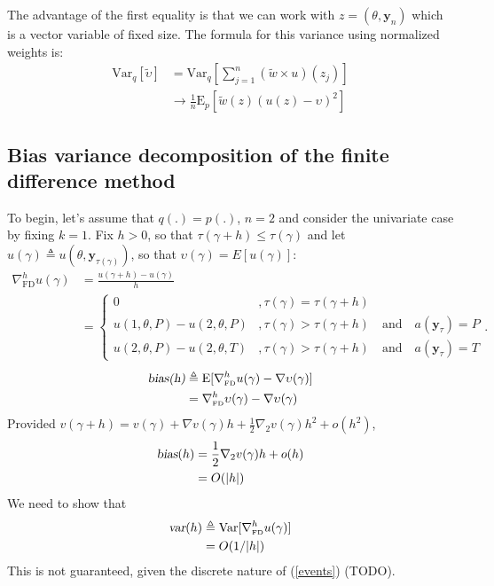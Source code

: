 \documentclass{article}
\begin{document}
The advantage of the first equality is that we can work with
$z=(\theta,\mathbf{y}_{n})$ which is a vector variable of fixed
size. The formula for this variance using normalized weights is:
\begin{align}
\mathrm{Var}_q[\tilde\upsilon]&=\mathrm{Var}_q[\sum_{j=1}^n
(\tilde w \times u)(z_j)]\\
&\rightarrow\frac{1}{n}\mathrm{E}_p[\tilde w(z)(u(z)-\upsilon)^2]
\end{align}

\subsection{Bias variance decomposition of the finite difference method}
To begin, let's assume that $q(.)=p(.)$, $n=2$ and consider the
univariate case by fixing $k=1$. Fix $h>0$, so that
$\tau(\gamma+h)\leq\tau(\gamma)$ and let $u(\gamma)\triangleq
u(\theta,\mathbf{y}_{\tau(\gamma)})$, so that
$\upsilon(\gamma)=E[u(\gamma)]$:
\begin{align}
\nabla_\mathrm{\scriptscriptstyle FD}^h
u(\gamma)&=\frac{u(\gamma+h)-
u(\gamma)}{h}\\&=\label{events}\begin{cases}
0&, \tau(\gamma)=\tau(\gamma+h)\\
u(1,\theta,P)-u(2,\theta,P)&, \tau(\gamma)>\tau(\gamma+h) \quad \mathrm{and}\quad a(\mathbf{y}_\tau)=P\\
u(2,\theta,P)-u(2,\theta,T)&, \tau(\gamma)>\tau(\gamma+h) \quad
\mathrm{and}\quad a(\mathbf{y}_\tau)=T
\end{cases}.
\end{align}
\begin{align}\textsl{bias(h)}&\triangleq
\mathrm{E}[\nabla_\mathrm{\scriptscriptstyle FD}^h u(\gamma)-\nabla
\upsilon(\gamma)]\\&=\nabla_\mathrm{\scriptscriptstyle FD}^h
\upsilon(\gamma)-\nabla \upsilon(\gamma)
\end{align}
Provided $v(\gamma+h)=v(\gamma)+\nabla v(\gamma)h+\frac{1}{2}
\nabla_2 v(\gamma)h^2+o(h^2)$,
\begin{align}
\textsl{bias}(h)&=\frac{1}{2} \nabla_2 v(\gamma)h+o(h)\\&=O(|h|)
\end{align}We need to show that
\begin{align}
\textsl{var}(h)&\triangleq\mathrm{Var}[\nabla_\mathrm{\scriptscriptstyle
FD}^h u(\gamma)]\\&=O(1/|h|)
\end{align}This is not guaranteed, given the discrete nature of
(\ref{events}) (TODO).
\end{document}
